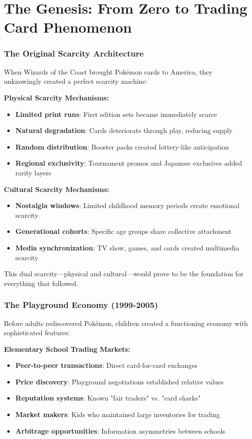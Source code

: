 \documentclass[11pt,oneside]{book}
\begin{document}
\section{The Genesis: From Zero to Trading Card Phenomenon}

\subsubsection{The Original Scarcity Architecture}

When Wizards of the Coast brought Pokémon cards to America, they unknowingly created a perfect scarcity machine:

\textbf{Physical Scarcity Mechanisms:}
\begin{itemize}
\item \textbf{Limited print runs}: First edition sets became immediately scarce
\item \textbf{Natural degradation}: Cards deteriorate through play, reducing supply
\item \textbf{Random distribution}: Booster packs created lottery-like anticipation
\item \textbf{Regional exclusivity}: Tournament promos and Japanese exclusives added rarity layers
\end{itemize}

\textbf{Cultural Scarcity Mechanisms:}
\begin{itemize}
\item \textbf{Nostalgia windows}: Limited childhood memory periods create emotional scarcity
\item \textbf{Generational cohorts}: Specific age groups share collective attachment
\item \textbf{Media synchronization}: TV show, games, and cards created multimedia scarcity
\end{itemize}

This dual scarcity—physical and cultural—would prove to be the foundation for everything that followed.

\subsubsection{The Playground Economy (1999-2005)}

Before adults rediscovered Pokémon, children created a functioning economy with sophisticated features:

\textbf{Elementary School Trading Markets:}
\begin{itemize}
\item \textbf{Peer-to-peer transactions}: Direct card-for-card exchanges
\item \textbf{Price discovery}: Playground negotiations established relative values
\item \textbf{Reputation systems}: Known "fair traders" vs. "card sharks"
\item \textbf{Market makers}: Kids who maintained large inventories for trading
\item \textbf{Arbitrage opportunities}: Information asymmetries between schools
\end{itemize}
\end{document}
